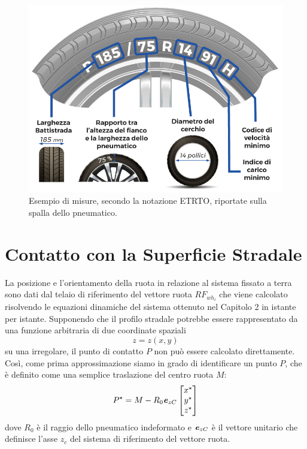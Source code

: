 \begin{figure}[h]
	\centering
	\includegraphics[width=0.7\linewidth]{Figures/tire_measures}
	\caption{Esempio di misure, secondo la notazione \ac{ETRTO}, riportate sulla spalla dello pneumatico.}
	\label{tiremeasures}
\end{figure}
%
\section{Contatto con la Superficie Stradale}
La posizione e l'orientamento della ruota in relazione al sistema fissato a terra sono dati dal telaio di riferimento del vettore ruota $RF_{wh_{i}}$ che viene calcolato risolvendo le equazioni dinamiche del sistema ottenuto nel Capitolo 2 in \cite{Larcher} istante per istante. Supponendo che il profilo stradale potrebbe essere rappresentato da una funzione arbitraria di due coordinate spaziali 
%
\begin{equation}
z=z(x,y)
\end{equation}
%
su una irregolare, il punto di contatto $P$ non può essere calcolato direttamente. Così, come prima approssimazione siamo in grado di identificare un punto $P$, che è definito come una semplice traslazione del centro ruota $M$:
%
\begin{equation}
P^\star = M-R_0\textbf{\textit{e}}_{zC}
\begin{bmatrix}
x^\star\\
y^\star\\
z^\star
\end{bmatrix}
\end{equation}
%
dove $R_0$ è il raggio dello pneumatico indeformato e $\textbf{\textit{e}}_{zC}$ è il vettore unitario che definisce l'asse $z_c$ del sistema di riferimento del vettore ruota.

